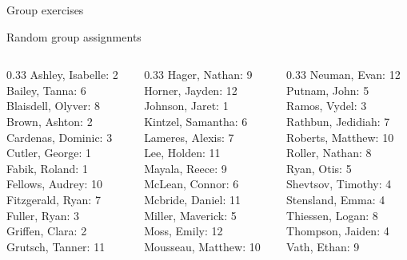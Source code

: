\documentclass[10pt]{beamer}
\begin{document}
\begin{frame}[standout]
Group exercises
\end{frame}

\begin{frame}{Random group assignments}
\begin{columns}
\begin{column}{0.33\textwidth}
Ashley, Isabelle: 2 \\ 
Bailey, Tanna: 6 \\ 
Blaisdell, Olyver: 8 \\ 
Brown, Ashton: 2 \\ 
Cardenas, Dominic: 3 \\ 
Cutler, George: 1 \\ 
Fabik, Roland: 1 \\ 
Fellows, Audrey: 10 \\ 
Fitzgerald, Ryan: 7 \\ 
Fuller, Ryan: 3 \\ 
Griffen, Clara: 2 \\ 
Grutsch, Tanner: 11 \\\end{column}
\begin{column}{0.33\textwidth}
Hager, Nathan: 9 \\ 
Horner, Jayden: 12 \\ 
Johnson, Jaret: 1 \\ 
Kintzel, Samantha: 6 \\ 
Lameres, Alexis: 7 \\ 
Lee, Holden: 11 \\ 
Mayala, Reece: 9 \\ 
McLean, Connor: 6 \\ 
Mcbride, Daniel: 11 \\ 
Miller, Maverick: 5 \\ 
Moss, Emily: 12 \\ 
Mousseau, Matthew: 10 \\\end{column}
\begin{column}{0.33\textwidth}
Neuman, Evan: 12 \\ 
Putnam, John: 5 \\ 
Ramos, Vydel: 3 \\ 
Rathbun, Jedidiah: 7 \\ 
Roberts, Matthew: 10 \\ 
Roller, Nathan: 8 \\ 
Ryan, Otis: 5 \\ 
Shevtsov, Timothy: 4 \\ 
Stensland, Emma: 4 \\ 
Thiessen, Logan: 8 \\ 
Thompson, Jaiden: 4 \\ 
Vath, Ethan: 9 \\\end{column}
\end{columns}
\end{frame}
\end{document}
